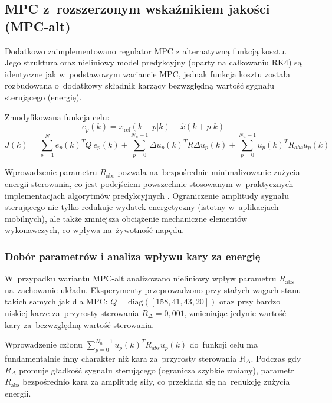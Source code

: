 \subsection{MPC z~rozszerzonym wskaźnikiem jakości (MPC-alt)}

Dodatkowo zaimplementowano regulator MPC z alternatywną funkcją kosztu. 
Jego struktura oraz nieliniowy model predykcyjny (oparty na całkowaniu RK4) są identyczne jak w~podstawowym wariancie MPC, jednak funkcja kosztu została rozbudowana
o~dodatkowy składnik karzący bezwzględną wartość sygnału sterującego (energię).

Zmodyfikowana funkcja celu:
\begin{equation}
e_{p}(k)={x}_{\mathrm{ref}}(k+p|k) - \hat{x}(k+p|k)
\end{equation}
\begin{equation} 
J(k)=\sum_{p=1}^{N}e_{p}(k)^{T}Q~e_{p}(k)+\sum_{p=0}^{N_{u}-1}\Delta u_{p}(k)^{T}R\Delta u_{p}(k) + \sum_{p=0}^{N_{u}-1} u_{p}(k)^{T}R_{abs} u_{p}(k)
\end{equation}

Wprowadzenie parametru $R_{\mathrm{abs}}$ pozwala na~bezpośrednie minimalizowanie
zużycia energii sterowania, co jest podejściem powszechnie stosowanym
w~praktycznych implementacjach algorytmów predykcyjnych \cite{Camacho2007}.
Ograniczenie amplitudy sygnału sterującego nie tylko redukuje wydatek energetyczny
(istotny w~aplikacjach mobilnych), ale także zmniejsza obciążenie mechaniczne
elementów wykonawczych, co wpływa na~żywotność napędu.

\subsubsection{Dobór parametrów i analiza wpływu kary za energię}
W~przypadku wariantu MPC-alt analizowano nieliniowy wpływ parametru $R_{\mathrm{abs}}$
na~zachowanie układu. Eksperymenty przeprowadzono przy stałych wagach stanu takich samych jak dla MPC:
$Q=\mathrm{diag}([158, 41, 43, 20])$
oraz przy bardzo niskiej karze za~przyrosty
sterowania $R_{\Delta} = 0{,}001$, zmieniając jedynie wartość kary za~bezwzględną 
wartość sterowania.

Wprowadzenie członu $\sum_{p=0}^{N_{u}-1} u_{p}(k)^{T}R_{abs} u_{p}(k)$ do~funkcji celu ma 
fundamentalnie inny charakter niż kara za~przyrosty sterowania $R_{\Delta}$. 
Podczas gdy $R_{\Delta}$ promuje gładkość sygnału sterującego (ogranicza szybkie
zmiany), parametr $R_{\mathrm{abs}}$ bezpośrednio kara za amplitudę siły, 
co przekłada się na~redukcję zużycia energii.

